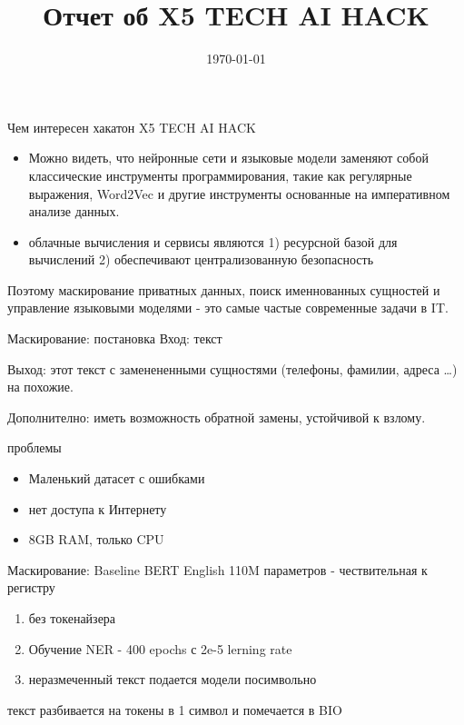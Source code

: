\documentclass[presentation]{beamer}
\date{\today}
\title{Отчет об X5 TECH AI HACK}
\begin{document}
\maketitle


\begin{frame}[label={sec:orga4d709e}]{Чем интересен хакатон X5 TECH AI HACK}
\begin{itemize}
\item Можно видеть, что нейронные сети и языковые модели заменяют собой
классические инструменты программирования, такие как регулярные
выражения, Word2Vec и другие инструменты основанные на императивном
анализе данных.
\item облачные вычисления и сервисы являются 1) ресурсной базой для
вычислений 2) обеспечивают централизованную безопасность
\end{itemize}

Поэтому маскирование приватных данных, поиск именнованных сущностей и
 управление языковыми моделями - это самые частые современные задачи в
 IT.
\end{frame}
\begin{frame}[label={sec:orgb6c7aa5}]{Маскирование: постановка}
Вход: текст

Выход: этот текст с заменененными сущностями (телефоны, фамилии,
 адреса \ldots{})  на похожие.

Дополнително: иметь возможность обратной замены, устойчивой к взлому.
\end{frame}
\begin{frame}[label={sec:org7cec237}]{проблемы}
\begin{itemize}
\item Маленький датасет с ошибками
\item нет доступа к Интернету
\item 8GB RAM, только CPU
\end{itemize}
\end{frame}
\begin{frame}[label={sec:orgffeb3ac}]{Маскирование: Baseline}
BERT English 110M параметров - чествительная к регистру
\begin{enumerate}
\item без токенайзера
\item Обучение NER - 400 epochs с 2e-5 lerning rate
\item неразмеченный текст подается модели посимвольно
\end{enumerate}

текст разбивается на токены в 1 символ и помечается в BIO
\end{frame}
\end{document}

